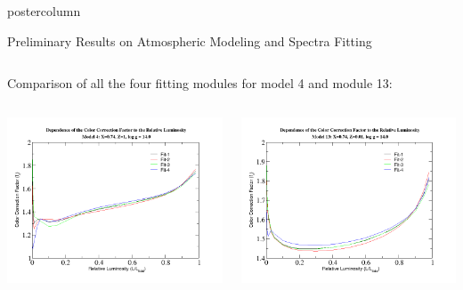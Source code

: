 \documentclass[final]{beamer}
\begin{document}
\begin{frame}
\begin{columns}
\begin{column}{.49\textwidth}
\begin{beamercolorbox}[center,wd=\textwidth]{postercolumn}
\begin{minipage}[T]{.95\textwidth}
{\begin{block}{Preliminary Results on  Atmospheric Modeling and Spectra Fitting }
\begin{columns}
\begin{column}{0.3\textwidth}
  \end{column}
  \end{columns}
  
  \quad
  
  \begin{center}  
   	{\scriptsize Comparison of all the four fitting modules for  model 4 and module 13:}
  \end{center}
  
  \begin{columns}
\begin{column}{0.5\textwidth} 
\begin{center}
		\includegraphics[width=0.98\linewidth]{all-fits2.png}
		\end{center}
  \end{column}
\begin{column}{0.5\textwidth} 
		\includegraphics[width=0.98\linewidth]{all-fits.png}
  \end{column}
  \end{columns}  




\end{block}}
\end{minipage}
\end{beamercolorbox}
\end{column}
\end{columns}
\end{frame}
\end{document}
